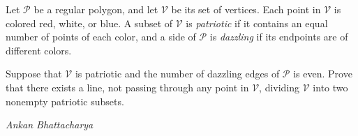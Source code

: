 Let $\mathcal{P}$ be a regular polygon, and let $\mathcal{V}$ be its set of vertices. Each point in $\mathcal{V}$ is colored red, white, or blue. A subset of $\mathcal{V}$ is \textit{patriotic} if it contains an equal number of points of each color, and a side of $\mathcal{P}$ is \textit{dazzling} if its endpoints are of different colors.

Suppose that $\mathcal{V}$ is patriotic and the number of dazzling edges of $\mathcal{P}$ is even. Prove that there exists a line, not passing through any point in $\mathcal{V}$, dividing $\mathcal{V}$ into two nonempty patriotic subsets.

\textit{Ankan Bhattacharya}